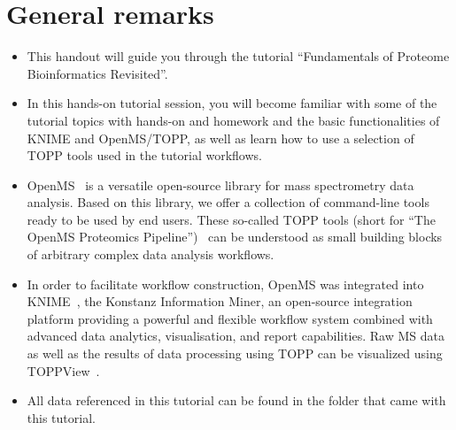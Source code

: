 
\section{General remarks}
\label{General remarks}

\begin{itemize}
\item This handout will guide you through the tutorial ``Fundamentals of Proteome Bioinformatics Revisited''.
\item In this hands-on tutorial session, you will become familiar with some of the tutorial topics with hands-on and homework and the basic functionalities of KNIME and OpenMS/TOPP, as well as learn how to use a selection of TOPP tools used in the tutorial workflows.
\item OpenMS~\cite{Sturm2008} is a versatile open-source library for mass spectrometry data analysis. Based on this library, we offer a collection
      of command-line tools ready to be used by end users. These so-called TOPP tools (short for ``The OpenMS Proteomics Pipeline'')~\cite{Kohlbacher2007} can be understood as
      small building blocks of arbitrary complex data analysis workflows.
\item In order to facilitate workflow construction, OpenMS was integrated into KNIME~\cite{KNIME}, the Konstanz
			Information Miner, an open-source integration platform providing a powerful and flexible workflow system
			combined with advanced data analytics, visualisation, and report capabilities. Raw MS data as well as the
			results of data processing using TOPP can be visualized using TOPPView~\cite{Sturm2009}.
\item All data referenced in this tutorial can be found in the  folder that came with this tutorial.
\end{itemize}


\setcounter{equation}{0}
